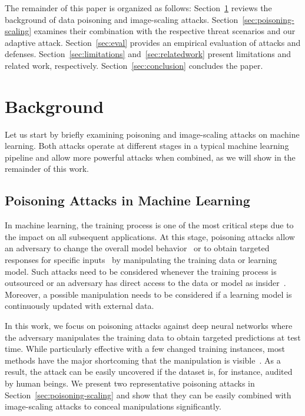 \documentclass[conference]{IEEEtran}
\begin{document}
The remainder of this paper is organized as follows: 
Section~\ref{sec:background} reviews the background of data poisoning 
and image-scaling attacks. Section~\ref{sec:poisoning-scaling} examines 
their combination with the respective threat scenarios and our adaptive 
attack.
Section~\ref{sec:eval} provides an empirical evaluation of attacks and 
defenses.
Section~\ref{sec:limitations} and~\ref{sec:relatedwork} present 
limitations and related work, respectively. 
Section~\ref{sec:conclusion} concludes the paper.



\section{Background}\label{sec:background}
Let us start by briefly examining poisoning and image-scaling 
attacks on machine learning. Both attacks operate at different stages 
in a typical machine learning pipeline and allow more powerful attacks 
when combined, as we will show in the remainder of this work.

\subsection{Poisoning Attacks in Machine Learning}
In machine learning, the training process is one of the most 
critical steps due to the impact on all subsequent applications. At 
this stage, poisoning attacks allow an adversary to change the overall 
model behavior~\citep[e.g.][]{KloLas10a,BigNelLas11}
or to obtain targeted responses for specific 
inputs~\citep[e.g.][]{GuDolGar17,ShaHuaNaj+18,LiuMaAaf+18} by 
manipulating the training data or learning model. Such attacks need to 
be considered whenever the training process is outsourced or an 
adversary has direct access to the data or model as 
insider~\citep{Sto15}. Moreover, a possible manipulation needs to be 
considered if a learning model is continuously updated with external 
data.


In this work, we focus on poisoning attacks against deep neural 
networks where the adversary manipulates the training data to obtain 
targeted predictions at test time. While particularly effective with a 
few changed training instances, most methods have the major shortcoming 
that the manipulation is visible~\citep[e.g.][]{GuDolGar17, 
	LiuMaAaf+18}. As a result, the attack can be easily uncovered if 
	the dataset is, for instance, audited by human beings.
We present two representative 
poisoning attacks in Section~\ref{sec:poisoning-scaling} and show 
that they can be easily combined with image-scaling attacks to
conceal manipulations significantly.
\end{document}
